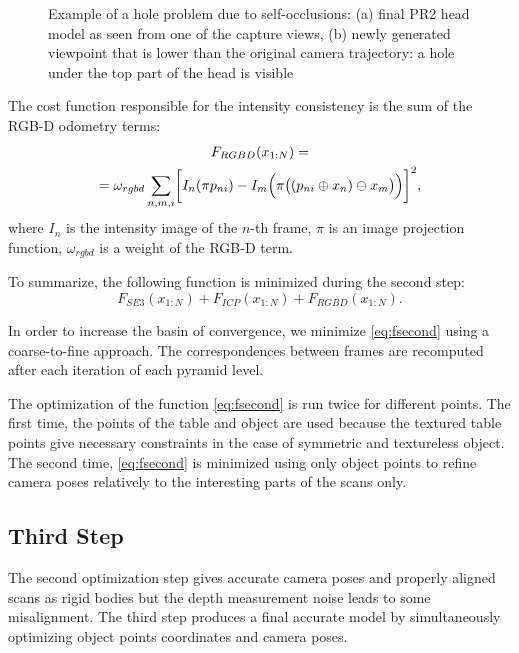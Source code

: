\documentclass[letterpaper, 10 pt, conference]{ieeeconf}  %
\begin{document}
\begin{figure}[t]
\begin{subfigure}[b]{0.45\linewidth}
                \caption{}
        \end{subfigure}
        \caption{Example of a hole problem due to self-occlusions:
        (a) final PR2 head model as seen from one of the capture views,
        (b) newly generated viewpoint that is lower than the original camera trajectory: a hole under 
        the top part of the head is visible}
        \label{fig:pr2}
\end{figure}

The cost function responsible for the intensity consistency is
the sum of the RGB-D odometry terms:
\begin{multline} \label{eq:frgbd}
F_{RGBD}(x_{1:N}) = \\
= \omega_{rgbd} \sum_{n,m,i} \biggl[I_n(\pi p_{ni}) - I_m\Bigl(\pi \bigl((p_{ni} \oplus x_n) \ominus x_m\bigr)\Bigr) \biggr]^2,
\end{multline}
where $I_n$ is the intensity image of the $n$-th frame, $\pi$ is an image projection function, $\omega_{rgbd}$
is a weight of the RGB-D term.

To summarize, the following function is minimized during the second step:
\begin{equation} \label{eq:fsecond}
F_{SE3}(x_{1:N}) + F_{ICP}(x_{1:N}) + F_{RGBD}(x_{1:N}).
\end{equation}

In order to increase the basin of convergence,
we minimize \eqref{eq:fsecond} using a coarse-to-fine approach.
The correspondences between frames are recomputed
after each iteration of each pyramid level.

The optimization of the function \eqref{eq:fsecond} is run 
twice for different points. The first time, the points of the table and object are used because 
the textured table points give necessary constraints in the case of symmetric and textureless object.
The second time, \eqref{eq:fsecond} is minimized using only object points to refine 
camera poses relatively to the interesting parts of the scans only.

\subsection{Third Step}

The second optimization step gives accurate camera poses and properly aligned scans
as rigid bodies but the depth measurement noise leads to some misalignment. The third step produces a 
final accurate model by
simultaneously optimizing object points coordinates and camera poses.
\end{document}
